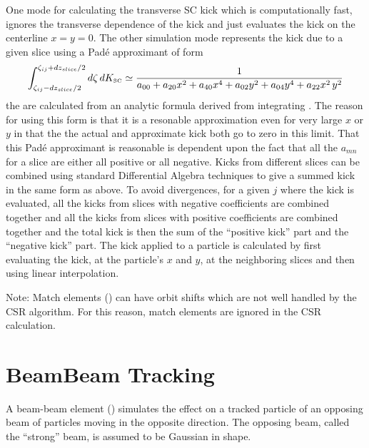 One mode for calculating the transverse SC kick which is computationally fast, ignores the
transverse dependence of the kick and just evaluates the kick on the centerline $x = y =
0$. The other simulation mode represents the kick due to a given slice using a Pad{\'e}
approximant of form
\begin{equation}
  \int_{\zeta_{ij}-dz_{slice}/2}^{\zeta_{ij}+dz_{slice}/2} d\zeta \, dK_{\mbox{\tiny SC}}
  \simeq \frac{1}{a_{00} + a_{20} x^2 + a_{40} x^4 + a_{02} y^2 + a_{04} y^4 + a_{22} x^2 \, y^2}
\end{equation}
the  are calculated from an analytic formula derived from integrating . The
reason for using this form is that it is a resonable approximation even for very large $x$ or $y$ in
that the the actual and approximate kick both go to zero in this limit. That this Pad{\'e}
approximant is reasonable is dependent upon the fact that all the $a_{mn}$ for a slice are either
all positive or all negative. Kicks from different slices can be combined using standard
Differential Algebra techniques to give a summed kick in the same form as above. To avoid
divergences, for a given $j$ where the kick is evaluated, all the kicks from slices with negative
coefficients are combined together and all the kicks from slices with positive coefficients are
combined together and the total kick is then the sum of the ``positive kick'' part and the
``negative kick'' part. The kick applied to a particle is calculated by first evaluating the kick,
at the particle's $x$ and $y$, at the neighboring slices and then using linear interpolation.

Note: Match elements () can have orbit shifts which are not well handled by the CSR
algorithm. For this reason, match elements are ignored in the CSR calculation.

\section{BeamBeam Tracking}
\label{s:beambeam.std}

A beam-beam element () simulates the effect on a tracked
particle of an opposing beam of particles moving in the opposite
direction. The opposing beam, called the ``strong'' beam, is assumed
to be Gaussian in shape.

